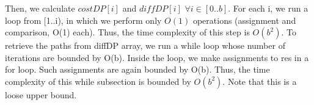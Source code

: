 \documentclass{article}
\begin{document}
\par Then, we calculate $costDP[i]$ and $diffDP[i]$ $\forall i \in [0..b]$. For each i, we run a loop from [1..i), in which we perform only $O(1)$ operations (assignment and comparison, O(1) each). Thus, the time complexity of this step is $O(b^{2})$. To retrieve the paths from diffDP array, we run a while loop whose number of iterations are bounded by O(b). Inside the loop, we make assignments to res in a for loop. Such assignments are again bounded by O(b). Thus, the time complexity of this while subsection is bounded by $O(b^2)$. Note that this is a loose upper bound.

\begin{center}
\end{center}
\end{document}
